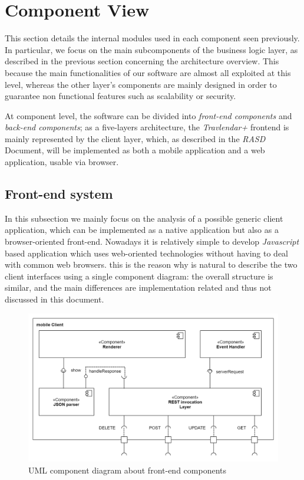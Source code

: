 \section{Component View}


This section details the internal modules used in each component seen previously.
In particular, we focus on the main subcomponents of the business logic layer, as described in the previous section concerning the architecture overview. 
This because the main functionalities  of our software are almost all exploited at this level, whereas the other layer's components are mainly
designed in order to guarantee non functional features such as scalability or security. 

At component level, the software can be divided into \emph{front-end components} and \emph{back-end components}; as a five-layers architecture, the \emph{Travlendar+} frontend is mainly represented by the client layer, which, as described in the \emph{RASD} Document, will be implemented as both a mobile application and a web application, usable via browser.
\subsection{Front-end system}
In this subsection we mainly focus on the analysis of a possible generic client application, which can be implemented as a native application but also as a browser-oriented front-end.
Nowadays it is relatively simple to develop \emph{Javascript} based application which uses web-oriented technologies without having to deal with common web browsers. this is the reason why is
natural to describe the two client interfaces using a single component diagram: the overall structure is similar, and the main differences are implementation related and thus not
discussed in this document.
\begin{figure}[H]
    \centering
    \includegraphics[scale=0.2]{Pictures/ComponentDiagram/client_component.png}
    \caption{UML component diagram about front-end components}
    \label{component:client}
\end{figure}

